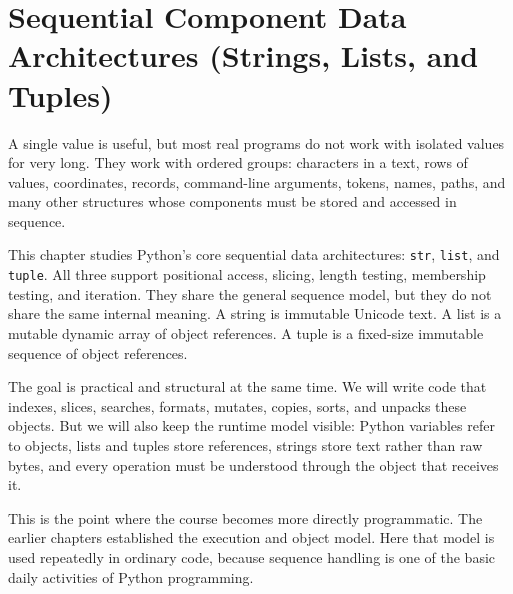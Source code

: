 \chapter{Sequential Component Data Architectures (Strings, Lists, and Tuples)}

A single value is useful, but most real programs do not work with isolated values for very long. They work with ordered groups: characters in a text, rows of values, coordinates, records, command-line arguments, tokens, names, paths, and many other structures whose components must be stored and accessed in sequence.

This chapter studies Python's core sequential data architectures: \texttt{str}, \texttt{list}, and \texttt{tuple}. All three support positional access, slicing, length testing, membership testing, and iteration. They share the general sequence model, but they do not share the same internal meaning. A string is immutable Unicode text. A list is a mutable dynamic array of object references. A tuple is a fixed-size immutable sequence of object references.

The goal is practical and structural at the same time. We will write code that indexes, slices, searches, formats, mutates, copies, sorts, and unpacks these objects. But we will also keep the runtime model visible: Python variables refer to objects, lists and tuples store references, strings store text rather than raw bytes, and every operation must be understood through the object that receives it.

This is the point where the course becomes more directly programmatic. The earlier chapters established the execution and object model. Here that model is used repeatedly in ordinary code, because sequence handling is one of the basic daily activities of Python programming.